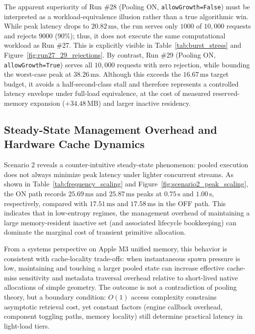 \documentclass[11pt]{article}
\begin{document}
The apparent superiority of Run \#28 (Pooling ON, \texttt{allowGrowth=False}) must be interpreted as a workload-equivalence illusion rather than a true algorithmic win. While peak latency drops to \(20.82\,\mathrm{ms}\), the run serves only \(1000\) of \(10{,}000\) requests and rejects \(9000\) (\(90\%\)); thus, it does not execute the same computational workload as Run \#27. This is explicitly visible in Table~\ref{tab:burst_stress} and Figure~\ref{fig:run27_29_rejections}. By contrast, Run \#29 (Pooling ON, \texttt{allowGrowth=True}) serves all \(10{,}000\) requests with zero rejection, while bounding the worst-case peak at \(38.26\,\mathrm{ms}\). Although this exceeds the \(16.67\,\mathrm{ms}\) target budget, it avoids a half-second-class stall and therefore represents a controlled latency envelope under full-load equivalence, at the cost of measured reserved-memory expansion (\(+34.48\,\mathrm{MB}\)) and larger inactive residency.

\subsection{Steady-State Management Overhead and Hardware Cache Dynamics}

Scenario 2 reveals a counter-intuitive steady-state phenomenon: pooled execution does not always minimize peak latency under lighter concurrent streams. As shown in Table~\ref{tab:frequency_scaling} and Figure~\ref{fig:scenario2_peak_scaling}, the ON path records \(25.69\,\mathrm{ms}\) and \(25.87\,\mathrm{ms}\) peaks at \(0.75\,\mathrm{s}\) and \(1.00\,\mathrm{s}\), respectively, compared with \(17.51\,\mathrm{ms}\) and \(17.58\,\mathrm{ms}\) in the OFF path. This indicates that in low-entropy regimes, the management overhead of maintaining a large memory-resident inactive set (and associated lifecycle bookkeeping) can dominate the marginal cost of transient primitive allocation.

From a systems perspective on Apple M3 unified memory, this behavior is consistent with cache-locality trade-offs: when instantaneous spawn pressure is low, maintaining and touching a larger pooled state can increase effective cache-miss sensitivity and metadata traversal overhead relative to short-lived native allocations of simple geometry. The outcome is not a contradiction of pooling theory, but a boundary condition: \(O(1)\) access complexity constrains asymptotic retrieval cost, yet constant factors (engine callback overhead, component toggling paths, memory locality) still determine practical latency in light-load tiers.
\end{document}
